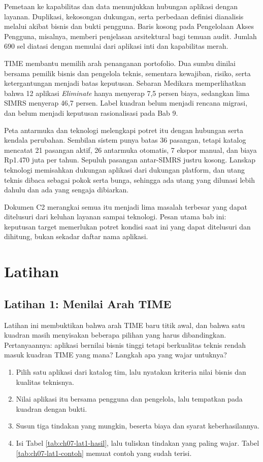 Pemetaan ke kapabilitas dan data menunjukkan hubungan aplikasi dengan layanan. Duplikasi, kekosongan dukungan, serta perbedaan definisi dianalisis melalui akibat bisnis dan bukti
pengguna. Baris kosong pada Pengelolaan Akses Pengguna, misalnya, memberi penjelasan arsitektural bagi temuan audit. Jumlah 690 sel diatasi dengan memulai dari aplikasi inti dan
kapabilitas merah.

TIME membantu memilih arah penanganan portofolio. Dua sumbu dinilai bersama pemilik bisnis dan pengelola teknis, sementara kewajiban, risiko, serta ketergantungan menjadi batas
keputusan. Sebaran Medikara memperlihatkan bahwa 12 aplikasi \textit{Eliminate} hanya menyerap 7,5 persen biaya, sedangkan lima SIMRS menyerap 46,7 persen. Label kuadran belum
menjadi rencana migrasi, dan belum menjadi keputusan rasionalisasi pada Bab 9.

Peta antarmuka dan teknologi melengkapi potret itu dengan hubungan serta kendala perubahan. Sembilan sistem punya batas 36 pasangan, tetapi katalog mencatat 21 pasangan aktif, 26
antarmuka otomatis, 7 ekspor manual, dan biaya Rp1.470 juta per tahun. Sepuluh pasangan antar-SIMRS justru kosong. Lanskap teknologi memisahkan dukungan aplikasi dari dukungan
platform, dan utang teknis dibaca sebagai pokok serta bunga, sehingga ada utang yang dilunasi lebih dahulu dan ada yang sengaja dibiarkan.

Dokumen C2 merangkai semua itu menjadi lima masalah terbesar yang dapat ditelusuri dari keluhan layanan sampai teknologi. Pesan utama bab ini: keputusan target memerlukan potret
kondisi saat ini yang dapat ditelusuri dan dihitung, bukan sekadar daftar nama aplikasi.

\section{Latihan}

\subsection*{Latihan 1: Menilai Arah TIME}

Latihan ini membuktikan bahwa arah TIME baru titik awal, dan bahwa satu kuadran masih menyisakan beberapa pilihan yang harus dibandingkan. Pertanyaannya: aplikasi bernilai bisnis tinggi tetapi
berkualitas teknis rendah masuk kuadran TIME yang mana? Langkah apa yang wajar untuknya?

\begin{enumerate}
  \item Pilih satu aplikasi dari katalog tim, lalu nyatakan kriteria nilai bisnis dan kualitas teknisnya.
  \item Nilai aplikasi itu bersama pengguna dan pengelola, lalu tempatkan pada kuadran dengan bukti.
  \item Susun tiga tindakan yang mungkin, beserta biaya dan syarat keberhasilannya.
  \item Isi Tabel \ref{tab:ch07-lat1-hasil}, lalu tuliskan tindakan yang paling wajar. Tabel \ref{tab:ch07-lat1-contoh} memuat contoh yang sudah terisi.
\end{enumerate}


